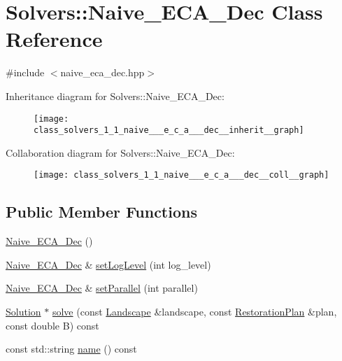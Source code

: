 \hypertarget{class_solvers_1_1_naive___e_c_a___dec}{}\section{Solvers\+:\+:Naive\+\_\+\+E\+C\+A\+\_\+\+Dec Class Reference}
\label{class_solvers_1_1_naive___e_c_a___dec}


{\ttfamily \#include $<$naive\+\_\+eca\+\_\+dec.\+hpp$>$}



Inheritance diagram for Solvers\+:\+:Naive\+\_\+\+E\+C\+A\+\_\+\+Dec\+:\nopagebreak
\begin{figure}[H]
\begin{center}
\leavevmode
\texttt{[image: class\_solvers\_1\_1\_naive\_\_\_e\_c\_a\_\_\_dec\_\_inherit\_\_graph]}
\end{center}
\end{figure}


Collaboration diagram for Solvers\+:\+:Naive\+\_\+\+E\+C\+A\+\_\+\+Dec\+:\nopagebreak
\begin{figure}[H]
\begin{center}
\leavevmode
\texttt{[image: class\_solvers\_1\_1\_naive\_\_\_e\_c\_a\_\_\_dec\_\_coll\_\_graph]}
\end{center}
\end{figure}
\subsection*{Public Member Functions}
\begin{DoxyCompactItemize}
\item 
\hyperlink{class_solvers_1_1_naive___e_c_a___dec_a31cb672115fcedb0f63c581ba3ccebdf}{Naive\+\_\+\+E\+C\+A\+\_\+\+Dec} ()
\item 
\hyperlink{class_solvers_1_1_naive___e_c_a___dec}{Naive\+\_\+\+E\+C\+A\+\_\+\+Dec} \& \hyperlink{class_solvers_1_1_naive___e_c_a___dec_a0a59573a3561ceaace10e38f282edc29}{set\+Log\+Level} (int log\+\_\+level)
\item 
\hyperlink{class_solvers_1_1_naive___e_c_a___dec}{Naive\+\_\+\+E\+C\+A\+\_\+\+Dec} \& \hyperlink{class_solvers_1_1_naive___e_c_a___dec_aac2179b8caf2d83ffd5cd63531be81aa}{set\+Parallel} (int parallel)
\item 
\hyperlink{class_solution}{Solution} $\ast$ \hyperlink{class_solvers_1_1_naive___e_c_a___dec_a51e13c5f7dac3c937f1a006c8b651657}{solve} (const \hyperlink{class_landscape}{Landscape} \&landscape, const \hyperlink{class_restoration_plan}{Restoration\+Plan} \&plan, const double B) const
\item 
const std\+::string \hyperlink{class_solvers_1_1_naive___e_c_a___dec_a171d5188c9901c251c57efdc9c8b954b}{name} () const
\end{DoxyCompactItemize}
